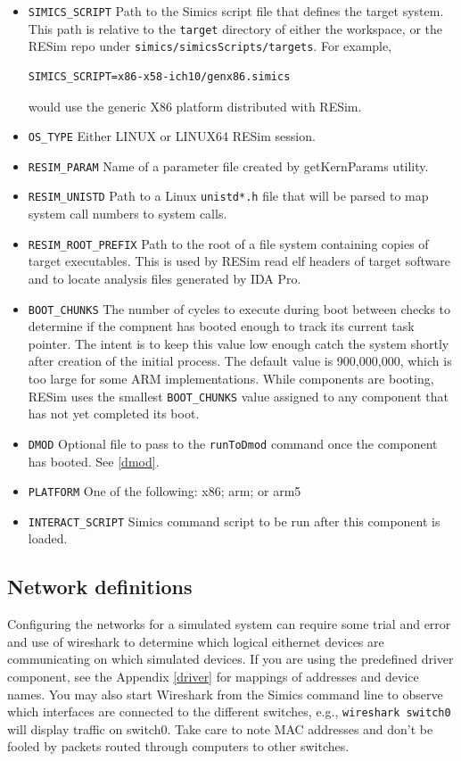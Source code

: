 \documentclass[titlepage]{article}
\begin{document}
\begin{itemize}
\item {\tt SIMICS\_SCRIPT} Path to the Simics script file that defines the target system.  This path is relative to the {\tt target} directory
of either the workspace, or the RESim repo under {\tt simics/simicsScripts/targets}.  For example, 
\begin{verbatim}
SIMICS_SCRIPT=x86-x58-ich10/genx86.simics
\end{verbatim}
\noindent would use the generic X86 platform distributed with RESim.
\item {\tt OS\_TYPE} Either LINUX or LINUX64
RESim session.
\item {\tt RESIM\_PARAM} Name of a parameter file created by getKernParams utility.
\item {\tt RESIM\_UNISTD} Path to a Linux {\tt unistd*.h} file that will be parsed to map system call numbers to system calls.
\item {\tt RESIM\_ROOT\_PREFIX} Path to the root of a file system containing copies of target executables.  This is used by RESim read elf
headers of target software and to locate analysis files generated by IDA Pro. 
\item {\tt BOOT\_CHUNKS} The number of cycles to execute during boot between checks to determine if the compnent has booted enough to track
its current task pointer.  The intent is to keep this value low enough catch the system shortly after creation of the initial process.
The default value is 900,000,000, which is too large for some ARM implementations.  While components are booting, RESim uses the smallest
{\tt BOOT\_CHUNKS} value assigned to any component that has not yet completed its boot.
\item {\tt DMOD} Optional file to pass to the {\tt runToDmod} command once the component has booted.  See \ref{dmod}.
\item {\tt PLATFORM} One of the following: x86; arm; or arm5
\item {\tt INTERACT\_SCRIPT} Simics command script to be run after this component is loaded.
\end{itemize}

\subsection{Network definitions}
\label{networks}
Configuring the networks for a simulated system can require some trial and error and use of wireshark to determine which
logical eithernet devices are communicating on which simulated devices.  If you are using the predefined driver component, see the 
Appendix \ref{driver} for mappings of addresses and device names.  You may also start Wireshark from the Simics command line to 
observe which interfaces are connected to the different switches, e.g., {\tt wireshark switch0} will display traffic on switch0.
Take care to note MAC addresses and don't be fooled by packets routed through computers to other switches.
\end{document}
